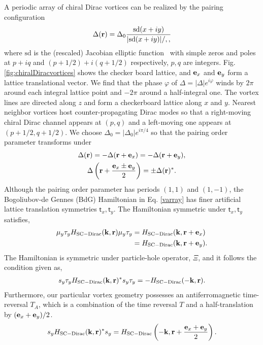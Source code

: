 A periodic array of chiral Dirac vortices can be realized by the pairing configuration
\begin{align}
\Delta({\bf r})=\Delta_0\frac{\mathrm{sd}(x+iy)}{|\mathrm{sd}(x+iy)| /,,}
\end{align} where $\mathrm{sd}$ is the (rescaled) Jacobian elliptic function~\cite{ReinhardtWalker10} with simple zeros and poles at $p+iq$ and $(p+1/2)+i(q+1/2)$ respectively, $p,q$ are integers. Fig. \ref{fig:chiralDiracvortices} shows the checker board lattice, and ${\bf e}_x$ and ${\bf e}_y$ form a lattice translational vector. We find that the phase $\varphi$ of $\Delta=|\Delta|e^{i\varphi}$ winds by $2\pi$ around each integral lattice point and $-2\pi$ around a half-integral one. The vortex lines are directed along $z$ and form a checkerboard lattice along $x$ and $y$. Nearest neighbor vortices host counter-propagating Dirac modes so that a right-moving chiral Dirac channel appears at $(p,q)$ and a left-moving one appears at $(p+1/2,q+1/2)$.
We choose $\Delta_0=|\Delta_0|e^{i\pi/4}$ so that the pairing order parameter transforms under
\begin{gather}
\Delta({\bf r})=-\Delta({\bf r}+{\bf e}_x)=-\Delta({\bf r}+{\bf e}_y),\nonumber\\\Delta\left({\bf r}+\frac{{\bf e}_x\pm{\bf e}_y}{2}\right)=\pm\Delta({\bf r})^\ast.
\end{gather}
Although the pairing order parameter has periods $(1,1)$ and $(1,-1)$, the Bogoliubov-de Gennes (BdG) Hamiltonian in Eq. \eqref{varray} has finer artificial lattice translation symmetries $\mathsf{t}_x,\mathsf{t}_y$. The Hamiltonian symmetric under $\mathsf{t}_x,\mathsf{t}_y$ satisfies,
\begin{align}
\mu_y\tau_yH_{\mathrm{SC-Dirac}}({\bf k},{\bf r})\mu_y\tau_y&=H_{\mathrm{SC-Dirac}}({\bf k},{\bf r}+{\bf e}_x)\nonumber\\&=H_{\mathrm{SC-Dirac}}({\bf k},{\bf r}+{\bf e}_y).
\label{latticetranslationH}
\end{align}
The Hamiltonian is symmetric under particle-hole operator, $\Xi$, and it follows the condition given as,
\begin{align}s_y\tau_yH_{\mathrm{SC-Dirac}}({\bf k},{\bf r})^\ast s_y\tau_y=-H_{\mathrm{SC-Dirac}}(-{\bf k},{\bf r}).\end{align}
Furthermore, our particular vortex geometry possesses an antiferromagnetic time-reversal $T_A$, which is a combination of the time reversal $T$ and a half-translation by $({\bf e}_x+{\bf e}_y)/2$.
\begin{align}s_yH_{\mathrm{SC-Dirac}}({\bf k},{\bf r})^\ast s_y=H_{\mathrm{SC-Dirac}}\left(-{\bf k},{\bf r}+\frac{{\bf e}_x+{\bf e}_y}{2}\right).\label{TAH}
\end{align}
